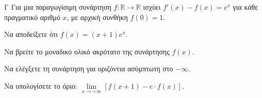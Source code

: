 \begin{thema}{Γ}
Για μια παραγωγίσιμη συνάρτηση $f: \mathbb{R} \to \mathbb{R}$ ισχύει $f'(x) - f(x) = e^x$ για κάθε πραγματικό αριθμό $x$, με αρχική συνθήκη $f(0) = 1$.
\begin{erwthma}
  \item Να αποδείξετε ότι $f(x) = (x+1)e^x$.
  \item Να βρείτε το μοναδικό ολικό ακρότατο της συνάρτησης $f(x)$.
  \item Να ελέγξετε τη συνάρτηση για οριζόντια ασύμπτωτη στο $-\infty$.
  \item Να υπολογίσετε το όριο: $\lim\limits_{x \to +\infty} \left[ f(x+1) - e \cdot f(x) \right]$.
\end{erwthma}
\end{thema}
